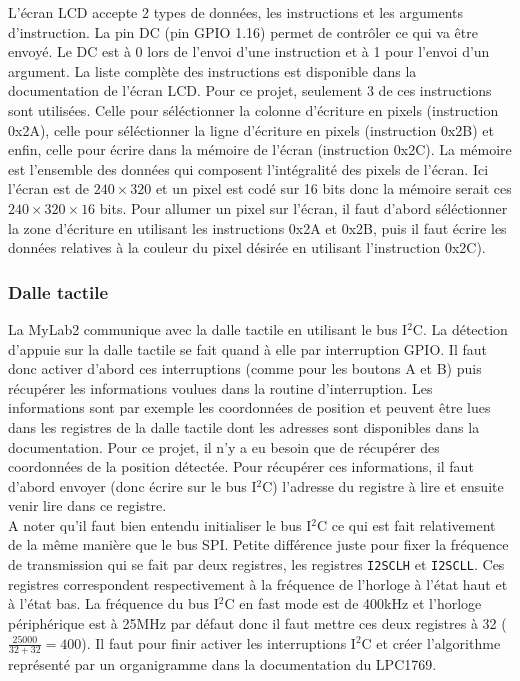 \documentclass[a4paper]{article}
\begin{document}
L'écran LCD accepte 2 types de données, les instructions et les arguments
d'instruction. La pin DC (pin GPIO 1.16) permet de contrôler ce qui va être envoyé.
Le DC est à 0 lors de l'envoi d'une instruction et à 1 pour l'envoi d'un argument.
La liste complète des instructions est disponible dans la documentation de l'écran
LCD. Pour ce projet, seulement 3 de ces instructions sont utilisées. Celle pour séléctionner
la colonne d'écriture en pixels (instruction 0x2A), celle pour séléctionner la ligne
d'écriture en pixels (instruction 0x2B) et enfin, celle pour écrire dans la mémoire
de l'écran (instruction 0x2C). La mémoire est l'ensemble des données qui composent
l'intégralité des pixels de l'écran. Ici l'écran est de $240 \times 320$ et un pixel
est codé sur 16 bits donc la mémoire serait ces $240 \times 320 \times 16$ bits.
Pour allumer un pixel sur l'écran, il faut d'abord séléctionner la zone d'écriture
en utilisant les instructions 0x2A et 0x2B, puis il faut écrire les données relatives 
à la couleur du pixel désirée en utilisant l'instruction 0x2C).

\subsubsection{Dalle tactile}
La MyLab2 communique avec la dalle tactile en utilisant le bus I$^2$C. La détection 
d'appuie sur la dalle tactile se fait quand à elle par interruption GPIO. Il faut
donc activer d'abord ces interruptions (comme pour les boutons A et B) puis récupérer 
les informations voulues dans la routine d'interruption. Les informations sont par 
exemple les coordonnées de position et peuvent être lues dans les registres de la 
dalle tactile dont les adresses sont disponibles dans la documentation. Pour ce projet, 
il n'y a eu besoin que de récupérer des coordonnées de la position détectée. Pour
récupérer  ces informations, il faut d'abord envoyer (donc écrire sur le bus I$^2$C)
l'adresse du registre à lire et ensuite venir lire dans ce registre. \\

A noter qu'il faut bien entendu initialiser le bus I$^2$C ce qui est fait relativement de la même
manière que le bus SPI. Petite différence juste pour fixer la fréquence de transmission
qui se fait par deux registres, les registres \texttt{I2SCLH} et \texttt{I2SCLL}.
Ces registres correspondent respectivement à la fréquence de l'horloge à l'état haut et à l'état
bas. La fréquence du bus I$^2$C en fast mode est de 400kHz et l'horloge périphérique
est à 25MHz par défaut donc il faut mettre ces deux registres à 32 ($\frac{25000}{32+32}=400$).
Il faut pour finir activer les interruptions I$^2$C et créer l'algorithme représenté
par un organigramme dans la documentation du LPC1769.
\end{document}
